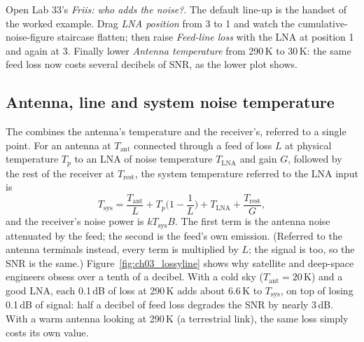 
\begin{tryit}
Open Lab 33's \emph{Friis: who adds the noise?}. The default line-up is the handset of the worked
example. Drag \emph{LNA position} from 3 to 1 and watch the cumulative-noise-figure staircase flatten;
then raise \emph{Feed-line loss} with the LNA at position 1 and again at 3. Finally lower
\emph{Antenna temperature} from 290\,K to 30\,K: the same feed loss now costs several decibels of SNR, as
the lower plot shows.
\end{tryit}

\subsection{Antenna, line and system noise temperature}
\label{sec:ch03:tsys}

The  combines the antenna's temperature and the receiver's, referred to a
single point. For an antenna at $T_{\text{ant}}$ connected through a feed of loss $L$ at physical
temperature $T_p$ to an LNA of noise temperature $T_{\text{LNA}}$ and gain $G$, followed by the rest of the
receiver at $T_{\text{rest}}$, the system temperature referred to the LNA input is
\begin{equation}
T_{\text{sys}}=\frac{T_{\text{ant}}}{L}+T_p\Big(1-\frac1L\Big)+T_{\text{LNA}}+\frac{T_{\text{rest}}}{G},
\label{eq:ch03:tsys}
\end{equation}
and the receiver's noise power is $kT_{\text{sys}}B$. The first term is the antenna noise attenuated by
the feed; the second is the feed's own emission. (Referred to the antenna terminals instead, every term is
multiplied by $L$; the signal is too, so the SNR is the same.) Figure~\ref{fig:ch03_lossyline} shows why
satellite and deep-space engineers obsess over a tenth of a decibel. With a cold sky ($T_{\text{ant}}=20$\,K)
and a good LNA, each 0.1\,dB of loss at 290\,K adds about 6.6\,K to $T_{\text{sys}}$, on top of losing
0.1\,dB of signal: half a decibel of feed loss degrades the SNR by nearly 3\,dB. With a warm antenna looking
at 290\,K (a terrestrial link), the same loss simply costs its own value.


